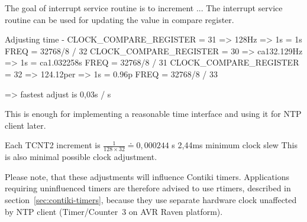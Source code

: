 The goal of interrupt service routine is to increment ...%
The interrupt service routine can be used for updating the value in compare register.

Adjusting time - CLOCK\_COMPARE\_REGISTER = 31 => 128Hz => 1s = 1s
FREQ = 32768/8 / 32
CLOCK\_COMPARE\_REGISTER = 30 => ca132.129Hz => 1s = ca1.032258s
FREQ = 32768/8 / 31
CLOCK\_COMPARE\_REGISTER = 32 => 124.12per => 1s = 0.96p
FREQ = 32768/8 / 33

=> fastest adjust is 0,03s / s


This is enough for implementing a reasonable time interface and using it for NTP client later.



Each TCNT2 increment is $\frac{1}{128 \times 32} \doteq 0,000244$ s
2,44ms minimum clock slew
This is also minimal possible clock adjustment.


Please note, that these adjustments will influence Contiki timers.
Applications requiring uninfluenced timers
are therefore advised to use rtimers, described in section~\ref{sec:contiki-timers},
because they use separate hardware clock unaffected by NTP client
(Timer/Counter~3 on AVR Raven platform).
